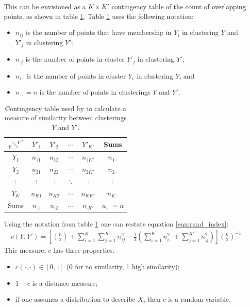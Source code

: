 \documentclass[12pt]{article} %
\begin{document}
	This can be envisioned as a $K \times K'$ contingency table of the count of overlapping points, as shown in table \ref{table:rand_contingency}. Table \ref{table:rand_contingency} uses the following notation:
	\begin{itemize}
	\item $n_{ij}$ is the number of points that have membership in $Y_i$ in clustering $Y$ and $Y'_j$ in clustering $Y'$;
	\item $n_{\cdot j}$ is the number of points in cluster $Y'_j$ in clustering $Y'$;
	\item $n_{i \cdot}$ is the number of points in cluster $Y_i$ in clustering $Y$; and
	\item $n_{\cdot \cdot} = n$ is the number of points in clusterings $Y$ and $Y'$.
	\end{itemize}
	\begin{table}[] 
	\centering
	\begin{tabular}{c|cccc|c} 
	$ {{} \atop Y}  \!\diagdown\! ^{Y'}$	& $Y'_1$	& $Y'_2$	& $\cdots$	& $Y'_{K'}$	& Sums	\\ 
	\hline
	$Y_1$		& $n_{11}$	& $n_{12}$	& $\cdots$	& $n_{1K'}$	& $n_{1 \cdot}$	\\
	$Y_2$		& $n_{21}$	& $n_{22}$	& $\cdots$	& $n_{2K'}$	& $n_{2 \cdot}$	\\
	$\vdots$	& $\vdots$	& $\vdots$	& $\ddots$	& $\vdots$	& $\vdots$		 \\
	$Y_{K}$	& $n_{K1}$	& $n_{K2}$	& $\cdots$	& $n_{KK'}$	& $n_{K \cdot}$	\\ 
	\hline
	 Sums	& $n_{\cdot 1}$	&  $n_{\cdot 2}$	& $\cdots$	& $n_{\cdot K'}$	& $n_{\cdot \cdot} = n$         
	\end{tabular}
	\caption{Contingency table used by \citet{RandObjectiveCriteriaEvaluation1971} to calculate a measure of similarity between clusterings $Y$ and $Y'$.}
	\label{table:rand_contingency}
	\end{table}
	Using the notation from table \ref{table:rand_contingency} one can restate equation \ref{eqn:rand_index}:
	\begin{eqnarray} \label{eqn:rand_index_alternative}
	c(Y, Y') = \left[\binom{n}{2} + \sum_{i=1}^K\sum_{j=1}^{K'}n_{ij}^2 - \frac{1}{2}\left(\sum_{i=1}^Kn_{i\cdot}^2 + \sum_{j=1}^{K'}n_{\cdot j}^2  \right) \right]  \binom{n}{2} ^{-1}
	\end{eqnarray}
	Thie measure, $c$ has three properties.
	\begin{itemize}
	\item $c(\cdot, \cdot) \in [0,1]$ (0 for no similarity, 1 high similarity);
	\item $1 - c$ is a distance measure;
	\item if one assumes a distribution to describe $X$, then $c$ is a random variable.
	\end{itemize}
\end{document}
